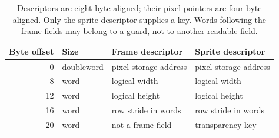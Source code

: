 \begin{table}[htbp]
  \centering
  \small
  \begin{tabular}{rlll}
    \toprule
    Byte offset & Size       & Frame descriptor      & Sprite descriptor     \\
    \midrule
    0           & doubleword & pixel-storage address & pixel-storage address \\
    8           & word       & logical width         & logical width         \\
    12          & word       & logical height        & logical height        \\
    16          & word       & row stride in words   & row stride in words   \\
    20          & word       & not a frame field     & transparency key      \\
    \bottomrule
  \end{tabular}
  \caption{Descriptors are eight-byte aligned; their pixel pointers are four-byte aligned. Only the sprite descriptor supplies a key. Words following the frame fields may belong to a guard, not to another readable field.}
  \label{tab:revision-clipped-descriptors}
\end{table}
